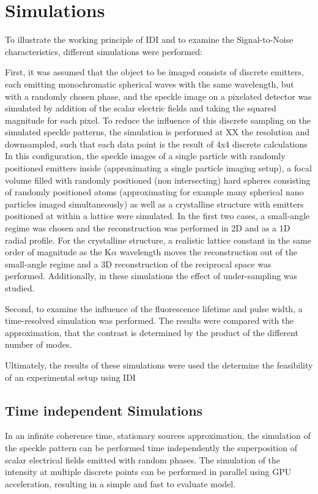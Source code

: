 \chapter{Simulations}
\label{chap:simulation}
To illustrate the working principle of IDI and to examine the Signal-to-Noise  characteristics, different simulations were performed:

First, it was assumed that the object to be imaged consists of discrete emitters, each emitting monochromatic spherical waves with the same wavelength, but with a randomly chosen phase, and the speckle image on a pixelated detector was simulated by addition of the scalar electric fields and taking the squared magnitude for each pixel. To reduce the influence of this discrete sampling on the simulated speckle patterns, the simulation is performed at XX the resolution and downsampled, such that each data point is the result of 4x4 discrete calculations
In this configuration, the speckle images of a single particle with randomly positioned emitters inside (approximating a single particle imaging setup), a focal volume filled with randomly positioned (non intersecting) hard spheres consisting of randomly positioned atoms (approximating for example many spherical nano particles imaged simultaneously) as well as a crystalline structure with emitters positioned at within a lattice were simulated. In the first two cases, a small-angle regime was chosen and the reconstruction was performed in 2D and as a 1D radial profile. For the crystalline structure, a realistic lattice constant in the same order of magnitude as the K$\alpha$ wavelength moves the reconstruction out of the small-angle regime and a 3D reconstruction of the reciprocal space was performed.
Additionally, in these simulations the effect of under-sampling was studied.

Second, to examine the influence of the fluorescence lifetime and pulse width, a time-resolved simulation was performed.
The results were compared with the approximation, that the contrast is determined by the product of the different number of modes.

Ultimately, the results of these simulations were used the determine the feasibility of an experimental setup using IDI







\section{Time independent Simulations}
In an infinite coherence time, stationary sources approximation, the simulation of the speckle pattern can be performed time independently the superposition of scalar electrical fields emitted with random phases. The simulation of the intensity at multiple discrete points can be performed in parallel using GPU acceleration, resulting in a simple and fast to evaluate model.



